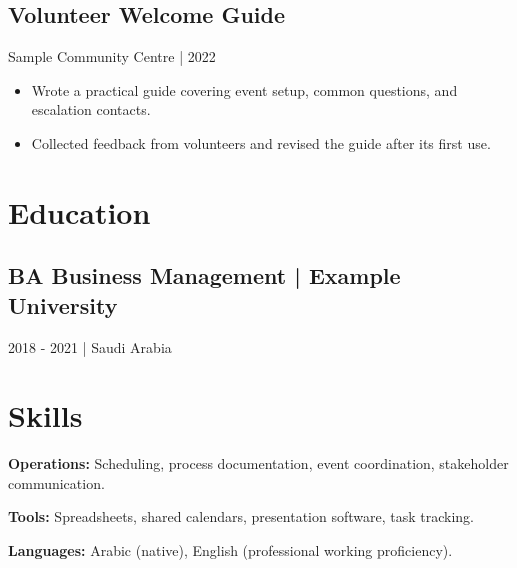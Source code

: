 \documentclass[a4paper,11pt]{article}
\begin{document}
\subsection*{Volunteer Welcome Guide}
Sample Community Centre | 2022\par
\begin{itemize}
\item Wrote a practical guide covering event setup, common questions, and escalation contacts.
\item Collected feedback from volunteers and revised the guide after its first use.
\end{itemize}
\section*{Education}
\subsection*{BA Business Management | Example University}
2018 - 2021 | Saudi Arabia\par
\section*{Skills}
\textbf{Operations:} Scheduling, process documentation, event coordination, stakeholder communication.\par
\textbf{Tools:} Spreadsheets, shared calendars, presentation software, task tracking.\par
\textbf{Languages:} Arabic (native), English (professional working proficiency).\par
\end{document}
